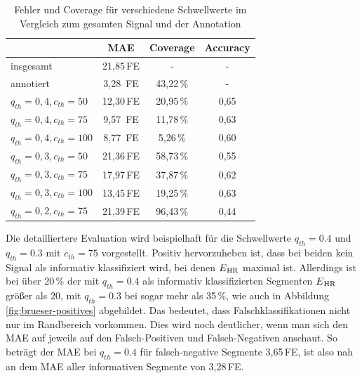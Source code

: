   \begin{table}[h] %
  
 	\centering
 	\begin{tabular}{l || c | c | c}
 									& \ac{MAE}			& Coverage		& Accuracy\\ \hline
 		insgesamt 					& 21{,}85\,\si{FE}	& -				& - \\
 		annotiert					& 3{,}28	\,\si{FE}	& 43{,}22\,\%	& - \\ \hline
 		$q_{th}=0{,}4, c_{th}=50$	& 12{,}30\,\si{FE}	& 20{,}95\,\%	& 0{,}65\\
 		$q_{th}=0{,}4, c_{th}=75$	& 9{,}57	\,\si{FE}	& 11{,}78\,\%	& 0{,}63\\
 		$q_{th}=0{,}4, c_{th}=100$	& 8{,}77	\,\si{FE}	& 5{,}26\,\%		& 0{,}60\\ \hline
 		$q_{th}=0{,}3, c_{th}=50$	& 21{,}36\,\si{FE}	& 58{,}73\,\%	& 0{,}55\\
 		$q_{th}=0{,}3, c_{th}=75$	& 17{,}97\,\si{FE}	& 37{,}87\,\%	& 0{,}62\\
 		$q_{th}=0{,}3, c_{th}=100$	& 13{,}45\,\si{FE}	& 19{,}25\,\%	& 0{,}63\\ \hline
 		$q_{th}=0{,}2, c_{th}=75$	& 21{,}39\,\si{FE}	& 96{,}43\,\%	& 0{,}44\\
 	\end{tabular}
 	\caption[Fehler und Coverage der Klassifikation nach der Ähnlichkeit der Intervallschätzer des CLIE-Algorithmus für verschiedene Schwellwerte im Vergleich zum gesamten Signal und der Annotation]{Fehler und Coverage für verschiedene Schwellwerte im Vergleich zum gesamten Signal und der Annotation}
 	\label{fig:brueser-sqi-MAE-Coverage}
 	\end{table}
 	
 Die detailliertere Evaluation wird beispielhaft für die Schwellwerte $q_{th} = 0.4$ und $q_{th} = 0.3$ mit $c_{th}=75$ vorgestellt. Positiv hervorzuheben ist, dass bei beiden kein Signal als informativ klassifiziert wird, bei denen $E\textsubscript{HR}$ maximal ist. Allerdings ist bei über 20\,\% der mit $q_{th} = 0.4$ als informativ klassifizierten Segmenten $E\textsubscript{HR}$ größer als 20, mit $q_{th} = 0.3$ bei sogar mehr als 35\,\%, wie auch in Abbildung \ref{fig:brueser-positives} abgebildet. Das bedeutet, dass Falschklassifikationen nicht nur im Randbereich vorkommen. Dies wird noch deutlicher, wenn man sich den \ac{MAE} auf jeweils auf den Falsch-Positiven und Falsch-Negativen anschaut. So beträgt der \ac{MAE} bei $q_{th} = 0.4$ für falsch-negative Segmente 3,65\,\si{FE}, ist also nah an dem \ac{MAE} aller informativen Segmente von 3,28\,\si{FE}.
 

